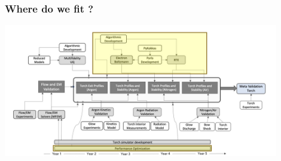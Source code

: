 \documentclass[mathserif, aspectratio=169]{beamer}
\newcommand{\vect}[1]{\boldsymbol{#1}}
\begin{document}

\begin{frame}[fragile]
	\frametitle{Where do we fit ? }
	\begin{center}
		\includegraphics[width=0.9\textwidth]{road_map.png}
	\end{center}
\end{frame}
\end{document}
